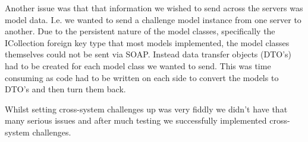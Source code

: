 Another issue was that that information we wished to send across the servers was model data. I.e. we wanted to send a challenge model instance from one server to another. Due to the persistent nature of the model classes, specifically the ICollection foreign key type that most models implemented, the model classes themselves could not be sent via SOAP. Instead data transfer objects (DTO’s) had to be created for each model class we wanted to send. This was time consuming as code had to be written on each side to convert the models to DTO’s and then turn them back. \par
Whilst setting cross-system challenges up was very fiddly we didn’t have that many serious issues and after much testing we successfully implemented cross-system challenges.


